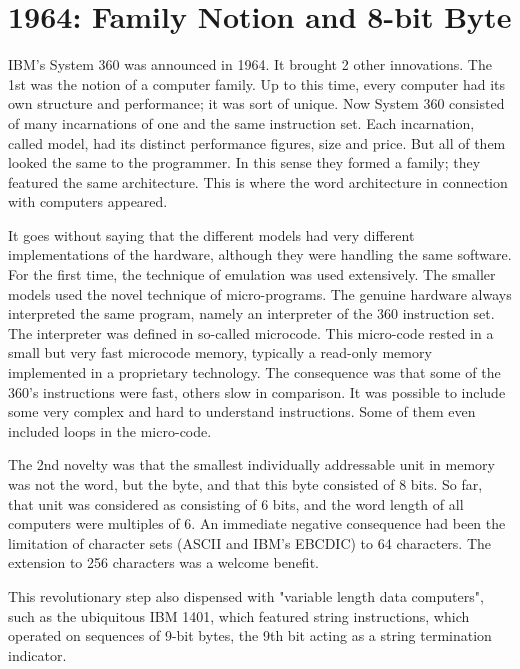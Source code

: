 \section{1964: Family Notion and 8-bit Byte}
IBM's System 360 was announced in 1964. It brought 2 other innovations. The
1st was the notion of a computer family. Up to this time, every computer had its
own structure and performance; it was sort of unique. Now System 360 consisted
of many incarnations of one and the same instruction set. Each incarnation, called
model, had its distinct performance figures, size and price. But all of them looked
the same to the programmer. In this sense they formed a family; they featured the
same architecture. This is where the word architecture in connection with
computers appeared.

It goes without saying that the different models had very different implementations
of the hardware, although they were handling the same software. For the first time,
the technique of emulation was used extensively. The smaller models used the
novel technique of micro-programs. The genuine hardware always interpreted the
same program, namely an interpreter of the 360 instruction set. The interpreter
was defined in so-called microcode. This micro-code rested in a small but very fast
microcode memory, typically a read-only memory implemented in a proprietary
technology. The consequence was that some of the 360's instructions were fast,
others slow in comparison. It was possible to include some very complex and hard
to understand instructions. Some of them even included loops in the micro-code.

The 2nd novelty was that the smallest individually addressable unit in memory
was not the word, but the byte, and that this byte consisted of 8 bits. So far, that
unit was considered as consisting of 6 bits, and the word length of all computers
were multiples of 6. An immediate negative consequence had been the limitation of
character sets (ASCII and IBM's EBCDIC) to 64 characters. The extension to 256
characters was a welcome benefit.

This revolutionary step also dispensed with "variable length data computers", such
as the ubiquitous IBM 1401, which featured string instructions, which operated on
sequences of 9-bit bytes, the 9th bit acting as a string termination indicator.

